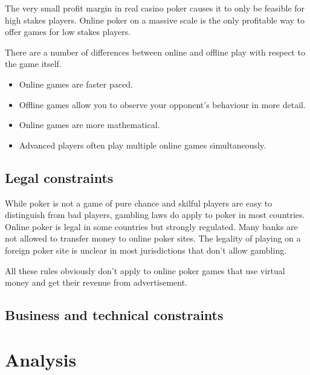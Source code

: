 \documentclass[a4paper,11pt]{report}
\begin{document}
The very small profit margin in real casino poker causes it to only be feasible for high stakes players. Online poker on a massive scale is the only profitable way to offer games for low stakes players.

There are a number of differences between online and offline play with respect to the game itself.
\begin{itemize}
 \item Online games are faster paced.
 \item Offline games allow you to observe your opponent's behaviour in more detail.
 \item Online games are more mathematical.
 \item Advanced players often play multiple online games simultaneously.
\end{itemize}

\section{Legal constraints}
While poker is not a game of pure chance and skilful players are easy to distinguish from bad players, gambling laws do apply to poker in most countries. Online poker is legal in some countries but strongly regulated. Many banks are not allowed to transfer money to online poker sites. The legality of playing on a foreign poker site is unclear in most jurisdictions that don't allow gambling.

All these rules obviously don't apply to online poker games that use virtual money and get their revenue from advertisement.

\section{Business and technical constraints}


\chapter{Analysis}
\end{document}
